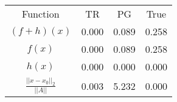 \begin{tabular}{| c |c |c |c |}
    \hline
    \rowcolor[gray]{0.9}
\multicolumn{4}{|c|}{Minima} \\ \hline Function & TR & PG & True \\
    \hline
  \rowcolor[gray]{0.7}
    $ (f + h)(x) $ & 0.000 & 0.089 & 0.258 \\
  \hline
  \rowcolor[gray]{0.8}
    $ f(x) $ & 0.000 & 0.089 & 0.258 \\
  \hline
  \rowcolor[gray]{0.7}
    $ h(x) $ & 0.000 & 0.000 & 0.000 \\
  \hline
  \rowcolor[gray]{0.8}
    $ \frac{||x - x_0||_2}{||A||} $ & 0.003 & 5.232 & 0.000 \\
  \hline
\end{tabular}
